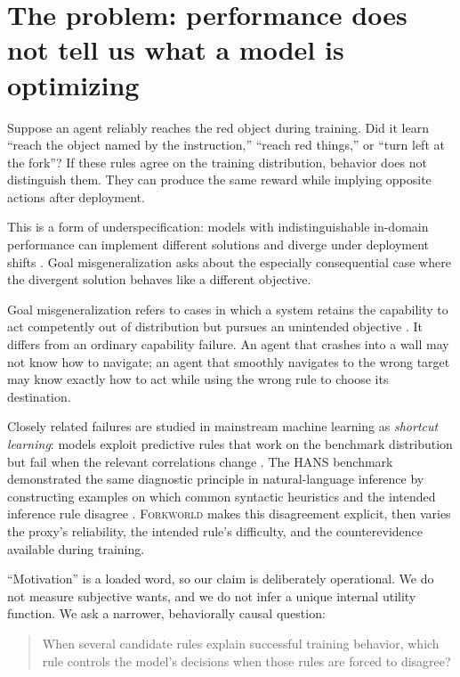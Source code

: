 \documentclass[11pt,a4paper]{article}
\newcommand{\Forkworld}{\textsc{Forkworld}}
\begin{document}
\section*{The problem: performance does not tell us what a model is optimizing}

Suppose an agent reliably reaches the red object during training. Did it learn ``reach the object named by the instruction,'' ``reach red things,'' or ``turn left at the fork''? If these rules agree on the training distribution, behavior does not distinguish them. They can produce the same reward while implying opposite actions after deployment.

This is a form of underspecification: models with indistinguishable in-domain performance can implement different solutions and diverge under deployment shifts \citep{damour2022underspecification}. Goal misgeneralization asks about the especially consequential case where the divergent solution behaves like a different objective.

Goal misgeneralization refers to cases in which a system retains the capability to act competently out of distribution but pursues an unintended objective \citep{langosco2022goal,shah2022goal}. It differs from an ordinary capability failure. An agent that crashes into a wall may not know how to navigate; an agent that smoothly navigates to the wrong target may know exactly how to act while using the wrong rule to choose its destination.

Closely related failures are studied in mainstream machine learning as \emph{shortcut learning}: models exploit predictive rules that work on the benchmark distribution but fail when the relevant correlations change \citep{geirhos2020shortcut}. The HANS benchmark demonstrated the same diagnostic principle in natural-language inference by constructing examples on which common syntactic heuristics and the intended inference rule disagree \citep{mccoy2019right}. \Forkworld{} makes this disagreement explicit, then varies the proxy's reliability, the intended rule's difficulty, and the counterevidence available during training.

``Motivation'' is a loaded word, so our claim is deliberately operational. We do not measure subjective wants, and we do not infer a unique internal utility function. We ask a narrower, behaviorally causal question:

\begin{quote}
When several candidate rules explain successful training behavior, which rule controls the model's decisions when those rules are forced to disagree?
\end{quote}
\end{document}
